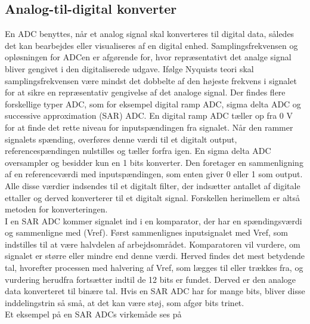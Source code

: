 \subsection{Analog-til-digital konverter}
En ADC benyttes, når et analog signal skal konverteres til digital data, således det kan bearbejdes eller visualiseres af en digital enhed. Samplingsfrekvensen og opløsningen for ADCen er afgørende for, hvor repræsentativt det analge signal bliver gengivet i den digitaliserede udgave. Ifølge Nyquists teori skal samplingsfrekvensen være mindst det dobbelte af den højeste frekvens i signalet for at sikre en repræsentativ gengivelse af det analoge signal. Der findes flere forskellige typer ADC, som for eksempel digital ramp ADC, sigma delta ADC og successive approximation (SAR) ADC. En digital ramp ADC tæller op fra 0 V for at finde det rette niveau for inputspændingen fra signalet. Når den rammer signalets spænding, overføres denne værdi til et digitalt output, referencespændingen nulstilles og tæller forfra igen. En sigma delta ADC oversampler og besidder kun en 1 bits konverter. Den foretager en sammenligning af en referenceværdi med inputspændingen, som enten giver 0 eller 1 som output. Alle disse værdier indsendes til et digitalt filter, der indsætter antallet af digitale ettaller og derved konverterer til et digitalt signal. Forskellen herimellem er altså metoden for konverteringen. \\
I en SAR ADC kommer signalet ind i en komparator, der har en spændingsværdi og sammenligne med (Vref). Først sammenlignes inputsignalet med Vref, som indstilles til at være halvdelen af arbejdsområdet. Komparatoren vil vurdere, om signalet er større eller mindre end denne værdi. Herved findes det mest betydende tal, hvorefter processen med halvering af Vref, som lægges til eller trækkes fra, og vurdering herudfra fortsætter indtil de 12 bits er fundet. Derved er den analoge data konverteret til binære tal. Hvis en SAR ADC har for mange bits, bliver disse inddelingstrin så små, at det kan være støj, som afgør bits trinet. \citep{Moore2004,Sheingold2014} \\
Et eksempel på en SAR ADCs virkemåde ses på 
